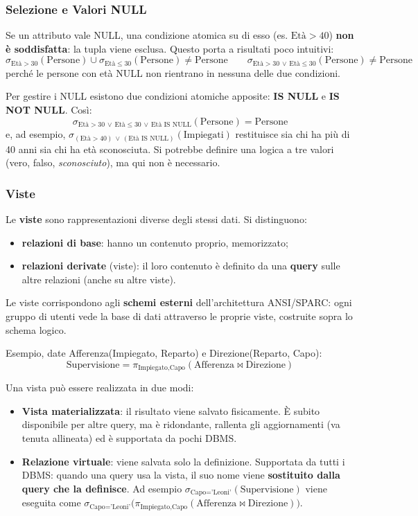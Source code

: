\documentclass[12pt]{extarticle}
\begin{document}
\subsubsection{Selezione e Valori NULL}
\noindent Se un attributo vale NULL, una condizione atomica su di esso (es. $\text{Età} > 40$) \textbf{non è soddisfatta}: la tupla viene esclusa. Questo porta a risultati poco intuitivi:
\[
\sigma_{\text{Età} > 30}(\text{Persone}) \cup \sigma_{\text{Età} \leq 30}(\text{Persone}) \neq \text{Persone}
\qquad
\sigma_{\text{Età} > 30 \,\vee\, \text{Età} \leq 30}(\text{Persone}) \neq \text{Persone}
\]
perché le persone con età NULL non rientrano in nessuna delle due condizioni.

\medskip
\noindent Per gestire i NULL esistono due condizioni atomiche apposite: \textbf{IS NULL} e \textbf{IS NOT NULL}. Così:
\[
\sigma_{\text{Età} > 30 \,\vee\, \text{Età} \leq 30 \,\vee\, \text{Età IS NULL}}(\text{Persone}) = \text{Persone}
\]
e, ad esempio, $\sigma_{(\text{Età} > 40) \,\vee\, (\text{Età IS NULL})}(\text{Impiegati})$ restituisce sia chi ha più di 40 anni sia chi ha età sconosciuta. Si potrebbe definire una logica a tre valori (vero, falso, \textit{sconosciuto}), ma qui non è necessario.

\subsubsection{Viste}
\noindent Le \textbf{viste} sono rappresentazioni diverse degli stessi dati. Si distinguono:
\begin{itemize}
    \item \textbf{relazioni di base}: hanno un contenuto proprio, memorizzato;
    \item \textbf{relazioni derivate} (viste): il loro contenuto è definito da una \textbf{query} sulle altre relazioni (anche su altre viste).
\end{itemize}
Le viste corrispondono agli \textbf{schemi esterni} dell'architettura ANSI/SPARC: ogni gruppo di utenti vede la base di dati attraverso le proprie viste, costruite sopra lo schema logico.

\medskip
\noindent Esempio, date Afferenza(Impiegato, Reparto) e Direzione(Reparto, Capo):
\[
\text{Supervisione} = \pi_{\text{Impiegato}, \text{Capo}}(\text{Afferenza} \bowtie \text{Direzione})
\]

\noindent Una vista può essere realizzata in due modi:
\begin{itemize}
    \item \textbf{Vista materializzata}: il risultato viene salvato fisicamente. È subito disponibile per altre query, ma è ridondante, rallenta gli aggiornamenti (va tenuta allineata) ed è supportata da pochi DBMS.
    \item \textbf{Relazione virtuale}: viene salvata solo la definizione. Supportata da tutti i DBMS: quando una query usa la vista, il suo nome viene \textbf{sostituito dalla query che la definisce}. Ad esempio $\sigma_{\text{Capo}=\text{'Leoni'}}(\text{Supervisione})$ viene eseguita come $\sigma_{\text{Capo}=\text{'Leoni'}}\big(\pi_{\text{Impiegato}, \text{Capo}}(\text{Afferenza} \bowtie \text{Direzione})\big)$.
\end{itemize}
\end{document}
